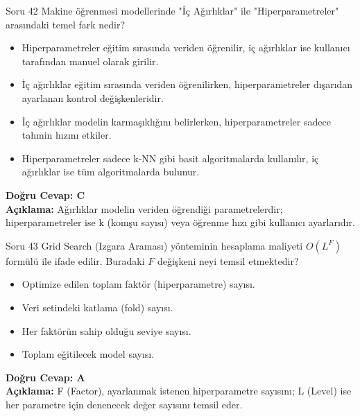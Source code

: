 \documentclass[12pt,a4paper]{article}
\begin{document}
\begin{testcard}{Soru 42}
    Makine öğrenmesi modellerinde "İç Ağırlıklar" ile "Hiperparametreler" arasındaki temel fark nedir?
    \begin{itemize}
        \item[A)] Hiperparametreler eğitim sırasında veriden öğrenilir, iç ağırlıklar ise kullanıcı tarafından manuel olarak girilir.
        \item[B)] İç ağırlıklar eğitim sırasında veriden öğrenilirken, hiperparametreler dışarıdan ayarlanan kontrol değişkenleridir.
        \item[C)] İç ağırlıklar modelin karmaşıklığını belirlerken, hiperparametreler sadece tahmin hızını etkiler.
        \item[D)] Hiperparametreler sadece k-NN gibi basit algoritmalarda kullanılır, iç ağırlıklar ise tüm algoritmalarda bulunur.
    \end{itemize}
    \tcblower
    \textbf{Doğru Cevap: C} \\
    \textbf{Açıklama:} Ağırlıklar modelin veriden öğrendiği parametrelerdir; hiperparametreler ise k (komşu sayısı) veya öğrenme hızı gibi kullanıcı ayarlarıdır.
\end{testcard}

\begin{testcard}{Soru 43}
    Grid Search (Izgara Araması) yönteminin hesaplama maliyeti $O(L^F)$ formülü ile ifade edilir. Buradaki $F$ değişkeni neyi temsil etmektedir?
    \begin{itemize}
        \item[A)] Optimize edilen toplam faktör (hiperparametre) sayısı.
        \item[B)] Veri setindeki katlama (fold) sayısı.
        \item[C)] Her faktörün sahip olduğu seviye sayısı.
        \item[D)] Toplam eğitilecek model sayısı.
    \end{itemize}
    \tcblower
    \textbf{Doğru Cevap: A} \\
    \textbf{Açıklama:} F (Factor), ayarlanmak istenen hiperparametre sayısını; L (Level) ise her parametre için denenecek değer sayısını temsil eder.
\end{testcard}
\end{document}
